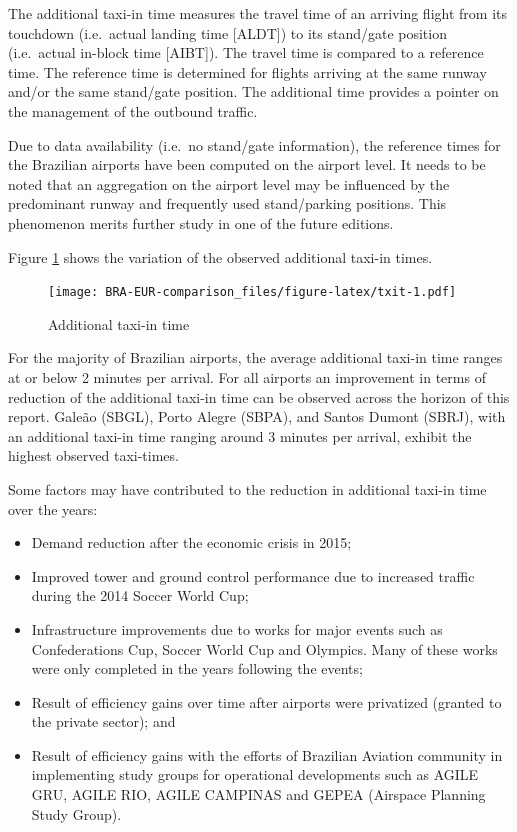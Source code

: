 \documentclass[
]{book}
\providecommand{\tightlist}{%
  \setlength{\itemsep}{0pt}\setlength{\parskip}{0pt}}
\begin{document}
The additional taxi-in time measures the travel time of an arriving flight from its touchdown (i.e.~actual landing time {[}ALDT{]}) to its stand/gate position (i.e.~actual in-block time {[}AIBT{]}). The travel time is compared to a reference time. The reference time is determined for flights arriving at the same runway and/or the same stand/gate position.
The additional time provides a pointer on the management of the outbound traffic.

Due to data availability (i.e.~no stand/gate information), the reference times for the Brazilian airports have been computed on the airport level.
It needs to be noted that an aggregation on the airport level may be influenced by the predominant runway and frequently used stand/parking positions. This phenomenon merits further study in one of the future editions.

Figure \ref{fig:txit} shows the variation of the observed additional taxi-in times.



\begin{figure}
\centering
\texttt{[image: BRA-EUR-comparison\_files/figure-latex/txit-1.pdf]}
\caption{\label{fig:txit}Additional taxi-in time}
\end{figure}

For the majority of Brazilian airports, the average additional taxi-in time ranges at or below 2 minutes per arrival.
For all airports an improvement in terms of reduction of the additional taxi-in time can be observed across the horizon of this report.
Galeão (SBGL), Porto Alegre (SBPA), and Santos Dumont (SBRJ), with an additional taxi-in time ranging around 3 minutes per arrival, exhibit the highest observed taxi-times.

Some factors may have contributed to the reduction in additional taxi-in time over the years:

\begin{itemize}
\tightlist
\item
  Demand reduction after the economic crisis in 2015;
\item
  Improved tower and ground control performance due to increased traffic during the 2014 Soccer World Cup;
\item
  Infrastructure improvements due to works for major events such as Confederations Cup, Soccer World Cup and Olympics. Many of these works were only completed in the years following the events;
\item
  Result of efficiency gains over time after airports were privatized (granted to the private sector); and
\item
  Result of efficiency gains with the efforts of Brazilian Aviation community in implementing study groups for operational developments such as AGILE GRU, AGILE RIO, AGILE CAMPINAS and GEPEA (Airspace Planning Study Group).
\end{itemize}
\end{document}
